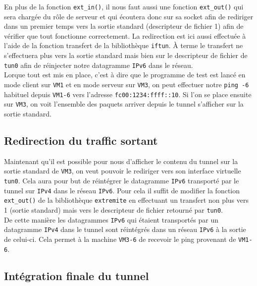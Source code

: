 \documentclass[a4paper, 12pt]{article}
\begin{document}
    En plus de la fonction \verb+ext_in()+, il nous faut aussi une fonction 
    \verb+ext_out()+ qui sera chargée du rôle de serveur et qui écoutera donc
    sur sa socket afin de rediriger dans un premier temps vers la sortie 
    standard (descripteur de fichier 1) afin de vérifier que tout fonctionne 
    correctement. La redirection est ici aussi effectuée à l'aide de la 
    fonction transfert de la bibliothèque \verb+iftun+. À terme le transfert ne
    s'effectuera plus vers la sortie standard mais bien sur le descripteur de 
    fichier de \verb+tun0+ afin de réinjecter notre datagramme \verb+IPv6+ dans
    le réseau. \\

    Lorque tout est mis en place, c'est à dire que le programme de test est
    lancé en mode client sur \verb+VM1+ et en mode serveur sur \verb+VM3+, on
    peut effectuer notre \verb+ping -6+ habituel depuis \verb+VM1-6+ vers 
    l'adresse \verb+fc00:1234:ffff::10+. Si l'on se place ensuite sur 
    \verb+VM3+, on voit l'ensemble des paquets arriver depuis le tunnel 
    s'afficher sur la sortie standard.

    \subsection{Redirection du traffic sortant}

    Maintenant qu'il est possible pour nous d'afficher le contenu du tunnel
    sur la sortie standard de \verb+VM3+, on veut pouvoir le rediriger vers son
    interface virtuelle \verb+tun0+. Cela aura pour but de réintégrer le 
    datagramme \verb+IPv6+ transporté par le tunnel sur \verb+IPv4+ dans le 
    réseau \verb+IPv6+. Pour cela il suffit de modifier la fonction 
    \verb+ext_out()+ de la bibliothèque \verb+extremite+ en effectuant un 
    transfert non plus vers 1 (sortie standard) mais vers le descripteur de
    fichier retourné par \verb+tun0+. \\

    De cette manière les datagrammes \verb+IPv6+ qui étaient transportés par un 
    datagramme \verb+IPv4+ dans le tunnel sont réintégrés dans un réseau 
    \verb+IPv6+ à la sortie de celui-ci. Cela permet à la machine \verb+VM3-6+ 
    de recevoir le ping provenant de \verb+VM1-6+.

    \subsection{Intégration finale du tunnel}
\end{document}
